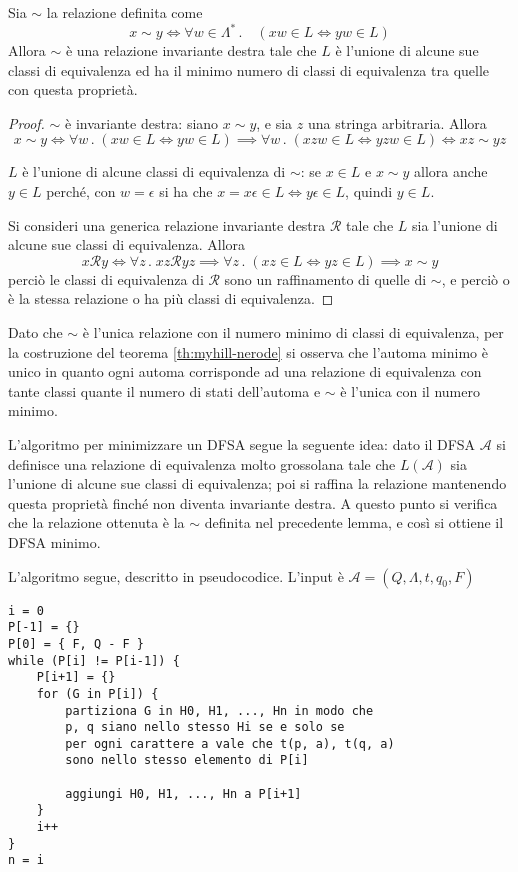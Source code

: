 \documentclass[12pt]{article}
\numberwithin{theorem}{subsection}
\begin{document}
\begin{lemma}\label{th:tilde-inv-destra}
	Sia $\sim$ la relazione definita come
	\[
	x \sim y \iff \forall w \in \Lambda^* \,.\quad ( xw \in L \iff yw \in L)
	\]
	Allora $\sim$ è una relazione invariante destra tale che $L$ è l'unione di alcune sue classi di equivalenza ed ha il minimo numero di classi di equivalenza tra quelle con questa proprietà.
\end{lemma}
\begin{proof}
	$\sim$ è invariante destra: siano $x \sim y$, e sia $z$ una stringa arbitraria. Allora
	\[
	x \sim y \iff \forall w \,.\; (xw \in L \iff yw \in L) \implies \forall w \,.\; (xzw \in L \iff yzw \in L) \iff xz \sim yz
	\]

	$L$ è l'unione di alcune classi di equivalenza di $\sim$: se $x \in L$ e $x \sim y$ allora anche $y \in L$ perché, con $w = \epsilon$ si ha che $x = x\epsilon \in L \iff y \epsilon \in L$, quindi $y \in L$.
	
	Si consideri una generica relazione invariante destra $\mathcal{R}$ tale che $L$ sia l'unione di alcune sue classi di equivalenza. Allora
	\[
	x \mathcal{R} y \iff \forall z \,.\; xz \mathcal{R} yz \implies \forall z \,.\; (xz \in L \iff yz \in L) \implies x \sim y
	\]
	perciò le classi di equivalenza di $\mathcal{R}$ sono un raffinamento di quelle di $\sim$, e perciò o è la stessa relazione o ha più classi di equivalenza.
\end{proof}

\begin{remark}
	Dato che $\sim$ è l'unica relazione con il numero minimo di classi di equivalenza, per la costruzione del teorema \ref{th:myhill-nerode} si osserva che l'automa minimo è unico in quanto ogni automa corrisponde ad una relazione di equivalenza con tante classi quante il numero di stati dell'automa e $\sim$ è l'unica con il numero minimo.
\end{remark}

L'algoritmo per minimizzare un DFSA segue la seguente idea: dato il DFSA $\mathcal{A}$ si definisce una relazione di equivalenza molto grossolana tale che $L(\mathcal{A})$ sia l'unione di alcune sue classi di equivalenza; poi si raffina la relazione mantenendo questa proprietà finché non diventa invariante destra. A questo punto si verifica che la relazione ottenuta è la $\sim$ definita nel precedente lemma, e così si ottiene il DFSA minimo.

L'algoritmo segue, descritto in pseudocodice. L'input è  $\mathcal{A} = ( Q, \Lambda, t, q_0, F )$
\begin{verbatim}
i = 0
P[-1] = {}
P[0] = { F, Q - F }
while (P[i] != P[i-1]) {
	P[i+1] = {}
	for (G in P[i]) {
		partiziona G in H0, H1, ..., Hn in modo che
		p, q siano nello stesso Hi se e solo se
		per ogni carattere a vale che t(p, a), t(q, a)
		sono nello stesso elemento di P[i]
		
		aggiungi H0, H1, ..., Hn a P[i+1]
	}
	i++
}
n = i
\end{verbatim}
\end{document}
